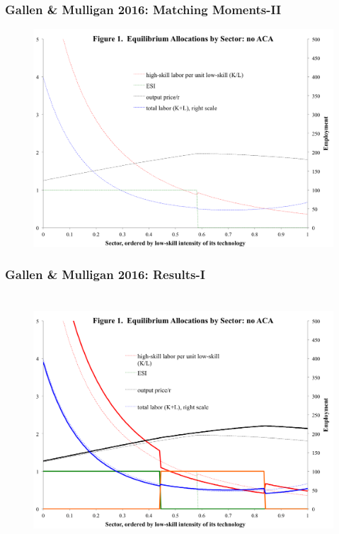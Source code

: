 \documentclass{beamer}
\begin{document}
\begin{frame}
\frametitle[alignment=center]{Gallen \& Mulligan 2016: Matching Moments-II}
\begin{figure}
\centering
\includegraphics[scale=0.42]{Fig2.png}
\end{figure}
\end{frame}

\begin{frame}
\frametitle[alignment=center]{Gallen \& Mulligan 2016: Results-I\ \\ \ }
\begin{figure}
\centering
\includegraphics[scale=0.42]{Fig3.png}
\end{figure}
\end{frame}
\end{document}
